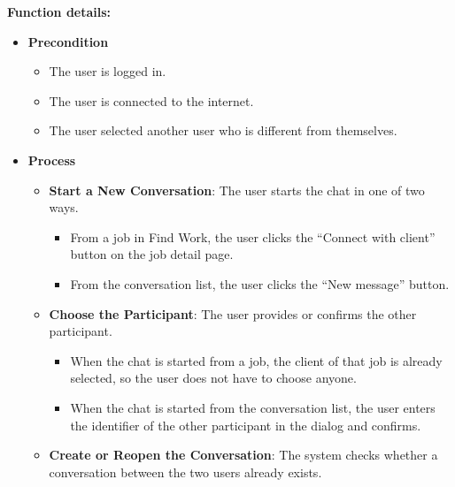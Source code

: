 \textbf{Function details:}
\begin{itemize}[leftmargin=1.6em,topsep=4pt,itemsep=3pt,parsep=0pt,label=$\bullet$]
    \item \textbf{Precondition}
        \begin{itemize}[leftmargin=2.2em,topsep=2pt,itemsep=3pt,parsep=0pt,label=$\circ$]
            \item The user is logged in.
            \item The user is connected to the internet.
            \item The user selected another user who is different from themselves.
        \end{itemize}
    \item \textbf{Process}
        \begin{itemize}[leftmargin=2.2em,topsep=2pt,itemsep=3pt,parsep=0pt,label=$\circ$]
            \item \textbf{Start a New Conversation}: The user starts the chat in one of two ways.\
                \begin{itemize}[leftmargin=2.2em,topsep=2pt,itemsep=3pt,parsep=0pt,label=$\blacksquare$]
                    \item From a job in Find Work, the user clicks the ``Connect with client'' button on the job detail page.
                    \item From the conversation list, the user clicks the ``New message'' button.
                \end{itemize}
            \item \textbf{Choose the Participant}: The user provides or confirms the other participant.\
                \begin{itemize}[leftmargin=2.2em,topsep=2pt,itemsep=3pt,parsep=0pt,label=$\blacksquare$]
                    \item When the chat is started from a job, the client of that job is already selected, so the user does not have to choose anyone.
                    \item When the chat is started from the conversation list, the user enters the identifier of the other participant in the dialog and confirms.
                \end{itemize}
            \item \textbf{Create or Reopen the Conversation}: The system checks whether a conversation between the two users already exists.\
                \begin{itemize}[leftmargin=2.2em,topsep=2pt,itemsep=3pt,parsep=0pt,label=$\blacksquare$]

\end{itemize}
\end{itemize}
\end{itemize}
